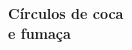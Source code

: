 \thispagestyle{empty}








\begingroup\thispagestyle{empty}\vspace*{.05\textheight} 


            \formular
            \Huge 
            \noindent
            \textbf{Círculos de coca\\e fumaça}
            \smallskip
                      
            \large
            \noindent\textit{}
            \normalsize 
            \vspace{2em}
                    
\endgroup
\vfill
\pagebreak